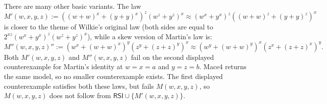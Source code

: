 \documentclass[eqnor,reqno]{amsart}
\theoremstyle{plain}
\theoremstyle{definition}
\newcommand{\RSI}{\textsf{RSI}}
\begin{document}

There are many other basic variants.  The law
\[
M'(w,x,y,z):= ((w+w)^x+(y+y)^x)^z (w^z+y^z)^x \approx (w^x+y^x)^z ((w+w)^z+(y+y)^z)^x
\]
is closer to the theme of Wilkie's original law (both sides are equal to $2^{xz}(w^x+y^x)^z(w^z+y^z)^x$), while a skew version of Martin's law is:
\[
M''(w,x,y,z)'':=(w^x+(w+w)^x)^y(z^y+(z+z)^y)^x\approx (w^y+(w+w)^y)^x(z^x+(z+z)^x)^y.
\]
Both $M'(w,x,y,z)$ and $M''(w,x,y,z)$ fail on the second displayed counterexample for Martin's identity at $w=x=a$ and $y=z=b$.  
Mace4 returns the same model, so no smaller counterexample exists.  The first displayed counterexample satisfies both these laws, but fails $M(w,x,y,z)$, so $M(w,x,y,z)$ does not follow from $\RSI\cup\{M'(w,x,y,z)\}$.
\end{document}
